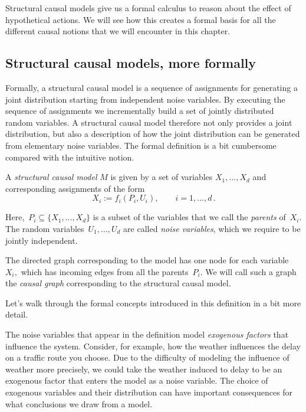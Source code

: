 \documentclass{tufte-book}
\begin{document}
Structural causal models give us a formal calculus to reason about the
effect of hypothetical actions. We will see how this creates a formal
basis for all the different causal notions that we will encounter in
this chapter.

\hypertarget{structural-causal-models-more-formally}{%
\subsection{Structural causal models, more
formally}\label{structural-causal-models-more-formally}}

Formally, a structural causal model is a
sequence of assignments for generating a joint distribution starting
from independent noise variables. By executing the sequence of
assignments we incrementally build a set of jointly distributed random
variables. A structural causal model therefore not only provides a joint
distribution, but also a description of how the joint distribution can
be generated from elementary noise variables. The formal definition is a
bit cumbersome compared with the intuitive notion.

\begin{Definition}

A \emph{structural causal model} \(M\) is given by a set of variables
\(X_1,..., X_d\) and corresponding assignments of the form \[
X_i := f_i(P_i, U_i),\quad\quad i=1,..., d\,.
\]

Here,~\(P_i\subseteq\{X_1,...,X_d\}\) is a subset of the variables that
we call the \emph{parents} of~\(X_i\). The random
variables~\(U_1,..., U_d\) are called \emph{noise variables}, which we
require to be jointly independent.

The directed graph corresponding to the model has one node for each
variable~\(X_i,\) which has incoming edges from all the parents~\(P_i.\)
We will call such a graph the \emph{causal graph} corresponding to the
structural causal model.

\end{Definition}

Let's walk through the formal concepts introduced in this definition in
a bit more detail.

The noise variables that appear in the definition model \emph{exogenous
factors} that influence the system. Consider, for example, how the
weather influences the delay on a traffic route you choose. Due to the
difficulty of modeling the influence of weather more precisely, we could
take the weather induced to delay to be an exogenous factor that enters
the model as a noise variable. The choice of exogenous variables and
their distribution can have important consequences for what conclusions
we draw from a model.
\end{document}
